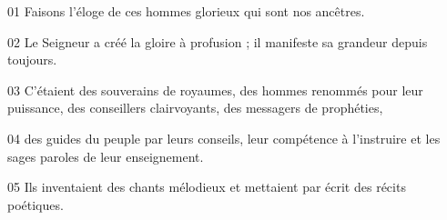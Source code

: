 01 Faisons l’éloge de ces hommes glorieux qui sont nos ancêtres.

02 Le Seigneur a créé la gloire à profusion ; il manifeste sa grandeur depuis toujours.

03 C’étaient des souverains de royaumes, des hommes renommés pour leur puissance, des conseillers clairvoyants, des messagers de prophéties,

04 des guides du peuple par leurs conseils, leur compétence à l’instruire et les sages paroles de leur enseignement.

05 Ils inventaient des chants mélodieux et mettaient par écrit des récits poétiques.
